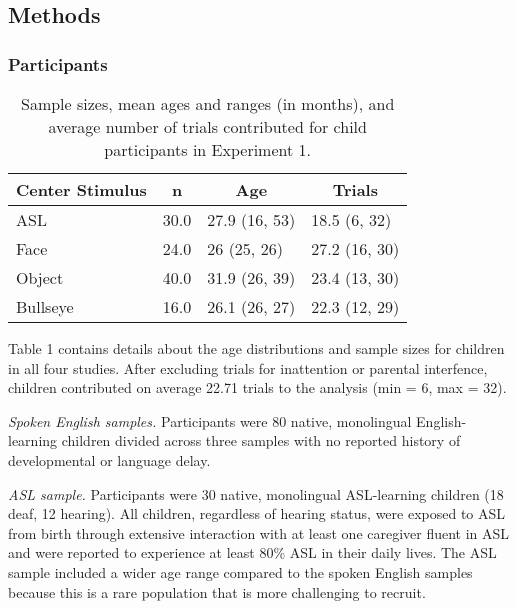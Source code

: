\documentclass[,man,floatsintext]{apa6}
\begin{document}
\hypertarget{methods}{%
\subsection{Methods}\label{methods}}

\hypertarget{participants}{%
\subsubsection{Participants}\label{participants}}

\begin{table}[tbp]
\begin{center}
\begin{threeparttable}
\caption{\label{tab:trio make participants table}Sample sizes, mean ages and ranges (in months), and average number of trials contributed for child participants in Experiment 1.}
\begin{tabular}{llll}
\toprule
Center Stimulus & \multicolumn{1}{c}{n} & \multicolumn{1}{c}{Age} & \multicolumn{1}{c}{Trials}\\
\midrule
ASL & 30.0 & 27.9 (16, 53) & 18.5 (6, 32)\\
Face & 24.0 & 26 (25, 26) & 27.2 (16, 30)\\
Object & 40.0 & 31.9 (26, 39) & 23.4 (13, 30)\\
Bullseye & 16.0 & 26.1 (26, 27) & 22.3 (12, 29)\\
\bottomrule
\end{tabular}
\end{threeparttable}
\end{center}
\end{table}

Table 1 contains details about the age distributions and sample sizes for children in all four studies. After excluding trials for inattention or parental interfence, children contributed on average 22.71 trials to the analysis (min = 6, max = 32).

\emph{Spoken English samples.} Participants were 80 native, monolingual English-learning children divided across three samples with no reported history of developmental or language delay.

\emph{ASL sample.} Participants were 30 native, monolingual ASL-learning children (18 deaf, 12 hearing). All children, regardless of hearing status, were exposed to ASL from birth through extensive interaction with at least one caregiver fluent in ASL and were reported to experience at least 80\% ASL in their daily lives. The ASL sample included a wider age range compared to the spoken English samples because this is a rare population that is more challenging to recruit.
\end{document}
